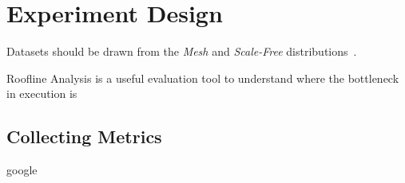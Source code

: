 \section{Experiment Design}
\label{section:33-GAI-Design}

Datasets should be drawn from the \textit{Mesh} and \textit{Scale-Free} distributions~\cite{Beamer2015}.

Roofline Analysis is a useful evaluation tool to understand where the bottleneck in execution is~\cite{Williams2009,Hennessy2019}

\subsection{Collecting Metrics}

google ~\cite{Ren2010,Kanev2015,Hennessy2019}
